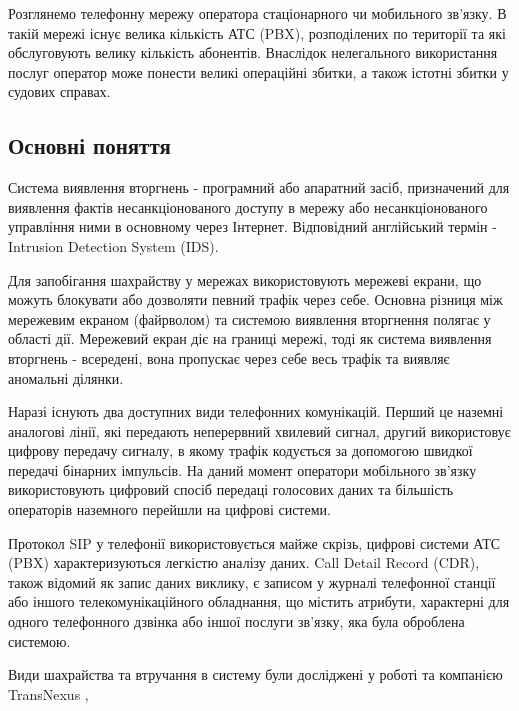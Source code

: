 	Розглянемо телефонну мережу оператора стаціонарного чи мобильного зв'язку. В такій мережі існує велика кількість АТС (PBX), розподілених по території та які обслуговують велику кількість абонентів. Внаслідок нелегального використання послуг оператор може понести великі операційні збитки, а також істотні збитки у судових справах.

\subsection{Основні поняття}

  Система виявлення вторгнень - програмний або апаратний засіб, призначений для виявлення фактів несанкціонованого доступу в мережу або несанкціонованого управління ними в основному через Інтернет. Відповідний англійський термін - Intrusion Detection System (IDS).

  Для запобігання шахрайству у мережах використовують мережеві екрани, що можуть блокувати або дозволяти певний трафік через себе.
  Основна різниця між мережевим екраном (файрволом) та системою виявлення вторгнення полягає у області дії. Мережевий екран діє на границі мережі, тоді як система виявлення вторгнень - всередені, вона пропускає через себе весь трафік та виявляє аномальні ділянки.

	Наразі існують два доступних види телефонних комунікацій. Перший це наземні аналогові лінії, які передають неперервний хвилевий сигнал, другий використовує цифрову передачу сигналу, в якому трафік кодується за допомогою швидкої передачі бінарних імпульсів. На даний момент оператори мобільного зв'язку використовують цифровий спосіб передаці голосових даних та більшість операторів наземного перейшли на цифрові системи.

	Протокол SIP у телефонії використовується майже скрізь, цифрові системи АТС (PBX) характеризуються легкістю аналізу даних. Call Detail Record (CDR), також відомий як запис даних виклику, є записом у журналі телефонної станції або іншого телекомунікаційного обладнання, що містить атрибути, характерні для одного телефонного дзвінка або іншої послуги зв'язку, яка була оброблена системою.

	Види шахрайства та втручання в систему були досліджені у роботі \cite{barson1996detection} та компанією TransNexus \cite{transnexus2012voipfraud},

